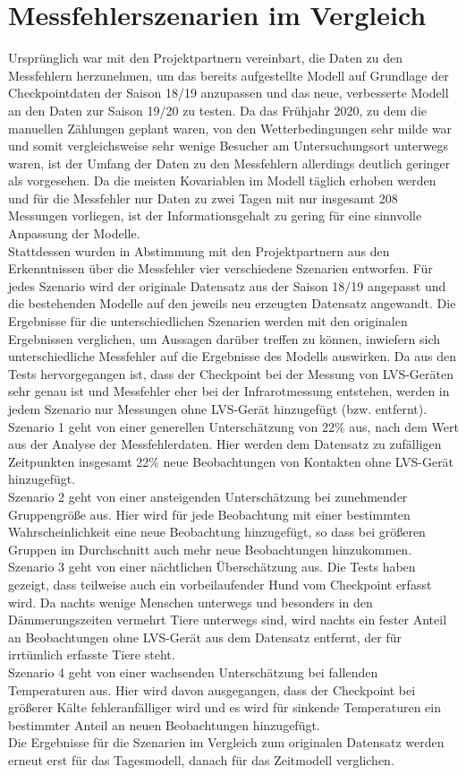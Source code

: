\documentclass[12pt]{scrreprt}
\begin{document}
\section{Messfehlerszenarien im Vergleich}
Ursprünglich war mit den Projektpartnern vereinbart, die Daten zu den Messfehlern herzunehmen, um das bereits aufgestellte Modell auf Grundlage der Checkpointdaten der Saison 18/19 anzupassen und das neue, verbesserte Modell an den Daten zur Saison 19/20 zu testen. Da das Frühjahr 2020, zu dem die manuellen Zählungen geplant waren, von den Wetterbedingungen sehr milde war und somit vergleichsweise sehr wenige Besucher am Untersuchungsort unterwegs waren, ist der Umfang der Daten zu den Messfehlern allerdings deutlich geringer als vorgesehen. Da die meisten Kovariablen im Modell täglich erhoben werden und für die Messfehler nur Daten zu zwei Tagen mit nur insgesamt 208 Messungen vorliegen, ist der Informationsgehalt zu gering für eine sinnvolle Anpassung der Modelle. \\
Stattdessen wurden in Abstimmung mit den Projektpartnern aus den Erkenntnissen über die Messfehler vier verschiedene Szenarien entworfen. Für jedes Szenario wird der originale Datensatz aus der Saison 18/19 angepasst und die bestehenden Modelle auf den jeweils neu erzeugten Datensatz angewandt. Die Ergebnisse für die unterschiedlichen Szenarien werden mit den originalen Ergebnissen verglichen, um Aussagen darüber treffen zu können, inwiefern sich unterschiedliche Messfehler auf die Ergebnisse des Modells auswirken. Da aus den Tests hervorgegangen ist, dass der Checkpoint bei der Messung von LVS-Geräten sehr genau ist und Messfehler eher bei der Infrarotmessung entstehen, werden in jedem Szenario nur Messungen ohne LVS-Gerät hinzugefügt (bzw. entfernt). \\
Szenario 1 geht von einer generellen Unterschätzung von 22\% aus, nach dem Wert aus der Analyse der Messfehlerdaten. Hier werden dem Datensatz zu zufälligen Zeitpunkten insgesamt 22\% neue Beobachtungen von Kontakten ohne LVS-Gerät hinzugefügt. \\
Szenario 2 geht von einer ansteigenden Unterschätzung bei zunehmender Gruppengröße aus. Hier wird für jede Beobachtung mit einer bestimmten Wahrscheinlichkeit eine neue Beobachtung hinzugefügt, so dass bei größeren Gruppen im Durchschnitt auch mehr neue Beobachtungen hinzukommen. \\
Szenario 3 geht von einer nächtlichen Überschätzung aus. Die Tests haben gezeigt, dass teilweise auch ein vorbeilaufender Hund vom Checkpoint erfasst wird. Da nachts wenige Menschen unterwegs und besonders in den Dämmerungszeiten vermehrt Tiere unterwegs sind, wird nachts ein fester Anteil an Beobachtungen ohne LVS-Gerät aus dem Datensatz entfernt, der für irrtümlich erfasste Tiere steht. \\
Szenario 4 geht von einer wachsenden Unterschätzung bei fallenden Temperaturen aus. Hier wird davon ausgegangen, dass der Checkpoint bei größerer Kälte fehleranfälliger wird und es wird für sinkende Temperaturen ein bestimmter Anteil an neuen Beobachtungen hinzugefügt. \\
Die Ergebnisse für die Szenarien im Vergleich zum originalen Datensatz werden erneut erst für das Tagesmodell, danach für das Zeitmodell verglichen.
\end{document}
